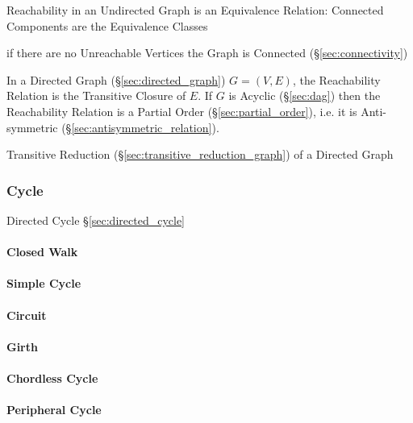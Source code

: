 Reachability in an Undirected Graph is an Equivalence Relation:
Connected Components are the Equivalence Classes

if there are no Unreachable Vertices the Graph is Connected
(\S\ref{sec:connectivity})

In a Directed Graph (\S\ref{sec:directed_graph}) $G = (V,E)$, the
Reachability Relation is the Transitive Closure of $E$. If $G$ is
Acyclic (\S\ref{sec:dag}) then the Reachability Relation is a Partial
Order (\S\ref{sec:partial_order}), i.e. it is Anti-symmetric
(\S\ref{sec:antisymmetric_relation}).

Transitive Reduction (\S\ref{sec:transitive_reduction_graph}) of a
Directed Graph



\subsubsection{Cycle}\label{sec:cycle}

Directed Cycle \S\ref{sec:directed_cycle}



\paragraph{Closed Walk}\label{sec:closed_walk}\hfill

\paragraph{Simple Cycle}\label{sec:simple_cycle}\hfill

\paragraph{Circuit}\label{sec:circuit}\hfill

\paragraph{Girth}\label{sec:girth}\hfill

\paragraph{Chordless Cycle}\label{sec:chordless_cycle}\hfill

\paragraph{Peripheral Cycle}\label{sec:peripheral_cycle}\hfill


